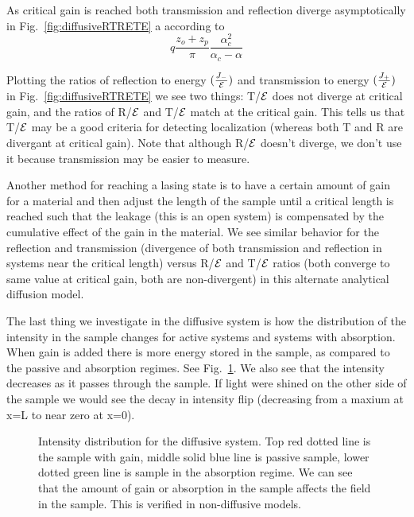 As critical gain is reached both transmission and reflection diverge asymptotically in Fig.~\ref{fig:diffusiveRTRETE} a according to
\begin{equation}
q \frac{z_o + z_p}{\pi} \frac{\alpha _c ^2}{\alpha _c - \alpha}
\end{equation}

Plotting the ratios of reflection to energy $( \frac{J_-}{\cal E} ) $
and transmission to energy $( \frac{J_+}{\cal E} ) $ in Fig.~\ref{fig:diffusiveRTRETE}
we see two things: T/${\cal E}$ does not diverge at critical gain, and the ratios 
of R/${\cal E}$ and T/${\cal E}$ match
at the critical gain. This tells us that T/${\cal E}$ may be a good
criteria for detecting localization (whereas both T and
R are divergant at critical gain).  Note that although
R/${\cal E}$ doesn't diverge, we don't use it because transmission may be 
easier to measure.

Another method for reaching a lasing state is to have a certain
amount of gain for a material and then adjust the length of the
sample until a critical length is reached such that the leakage
(this is an open system) is compensated by the cumulative
effect of the gain in the material. We see similar behavior
for the reflection and transmission (divergence of both transmission
and reflection in systems
near the critical length) versus R/${\cal E}$ and T/${\cal E}$ ratios (both converge
to same value at critical gain, both are non-divergent) in this
alternate analytical diffusion model.

The last thing we investigate in the diffusive system
is how the distribution of the intensity in the sample changes
for active systems and systems with absorption. When gain
is added there is more energy stored in the sample, as compared
to the passive and absorption regimes. See
Fig.~\ref{fig:diffusiveIntensityDistribution}. We also see that the intensity
decreases as it passes through the sample. If light were
shined on the other side of the sample we would see the decay
in intensity flip (decreasing from a maxium at x=L to near
zero at x=0).

\begin{figure}
\vskip -0.5cm
\vskip -0.5cm
\caption{Intensity distribution for the diffusive
system. Top red dotted line is 
the sample with gain, middle solid blue
line is passive sample, lower dotted green line
is sample in the absorption regime. We can see that the 
amount of gain or absorption in the sample affects the
field in the sample. This is verified in non-diffusive models.}
\label{fig:diffusiveIntensityDistribution}
\end{figure}

